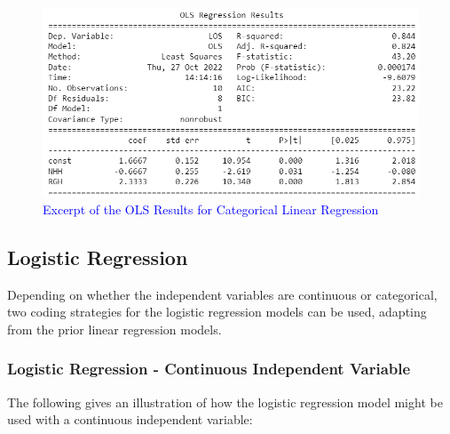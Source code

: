 \documentclass[../thesis.tex]{subfiles}
\begin{document}
\begin{figure}[h!]
    \centering
    \includegraphics{Chapters/Chapter3New/Figures/OLS Results - Cat1.png}
    \caption{\textcolor{blue}{Excerpt of the OLS Results for Categorical Linear Regression}}
    \label{fig:OLSCatLinReg}
\end{figure}

\subsection{Logistic Regression}
Depending on whether the independent variables are continuous or categorical, two coding strategies for the logistic regression models can be used, adapting from the prior linear regression models.

\subsubsection{Logistic Regression - Continuous Independent Variable}
The following gives an illustration of how the logistic regression model might be used with a continuous independent variable:
\end{document}
